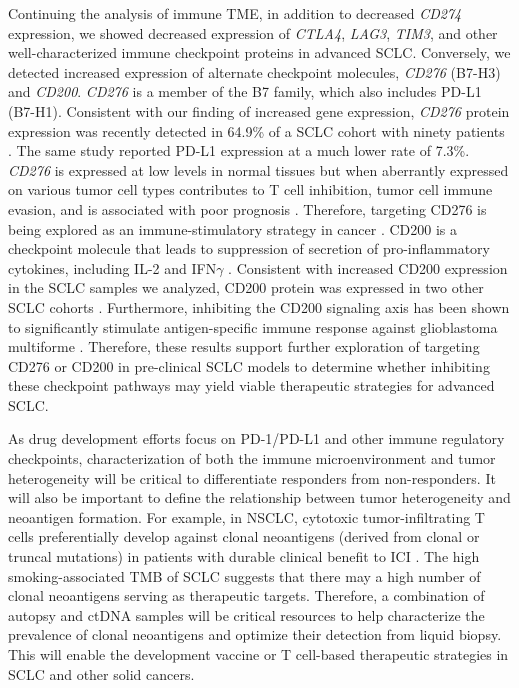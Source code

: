 Continuing the analysis of immune TME, in addition to decreased \textit{CD274} expression, we showed decreased expression of \textit{CTLA4}, \textit{LAG3}, \textit{TIM3}, and other well-characterized immune checkpoint proteins in advanced SCLC\@. Conversely, we detected increased expression of alternate checkpoint molecules, \textit{CD276} (B7-H3) and \textit{CD200}. \textit{CD276} is a member of the B7 family, which also includes PD-L1 (B7-H1). Consistent with our finding of increased gene expression, \textit{CD276} protein expression was recently detected in 64.9\% of a SCLC cohort with ninety patients \cite{carvajalhausdorf2019}. The same study reported PD-L1 expression at a much lower rate of 7.3\%. \textit{CD276} is expressed at low levels in normal tissues but when aberrantly expressed on various tumor cell types contributes to T cell inhibition, tumor cell immune evasion, and is associated with poor prognosis \cite{dong2018}. Therefore, targeting CD276 is being explored as an immune-stimulatory strategy in cancer \cite{picarda2016}. CD200 is a checkpoint molecule that leads to suppression of secretion of pro-inflammatory cytokines, including IL-2 and IFN$\gamma$ \cite{xiong2020}. Consistent with increased CD200 expression in the SCLC samples we analyzed, CD200 protein was expressed in two other SCLC cohorts \cite{bohling2015,love2017}. Furthermore, inhibiting the CD200 signaling axis has been shown to significantly stimulate antigen-specific immune response against glioblastoma multiforme \cite{xiong2020}. Therefore, these results support further exploration of targeting CD276 or CD200 in pre-clinical SCLC models to determine whether inhibiting these checkpoint pathways may yield viable therapeutic strategies for advanced SCLC\@.

As drug development efforts focus on PD-1/PD-L1 and other immune regulatory checkpoints, characterization of both the immune microenvironment and tumor heterogeneity will be critical to differentiate responders from non-responders. It will also be important to define the relationship between tumor heterogeneity and neoantigen formation. For example, in NSCLC, cytotoxic tumor-infiltrating T cells preferentially develop against clonal neoantigens (derived from clonal or truncal mutations) in patients with durable clinical benefit to ICI \cite{mcgranahan2016}. The high smoking-associated TMB of SCLC suggests that there may a high number of clonal neoantigens serving as therapeutic targets. Therefore, a combination of autopsy and ctDNA samples will be critical resources to help characterize the prevalence of clonal neoantigens and optimize their detection from liquid biopsy. This will enable the development vaccine or T cell-based therapeutic strategies in SCLC and other solid cancers.

